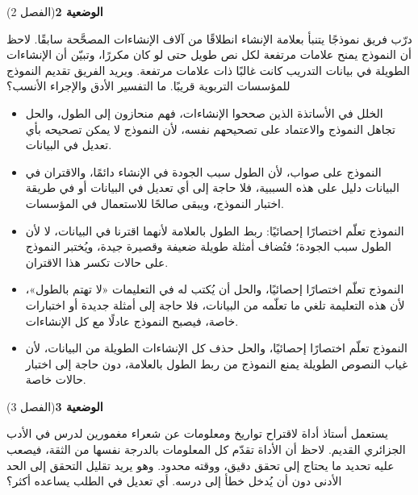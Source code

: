 \documentclass[11pt,a4paper]{article}
\begin{document}
\par\vspace{6pt}
\noindent
{\large\khatt\textbf{الوضعية 2}}\hfill{\small(الفصل 2)}\par\nopagebreak\vspace{3pt}
\setlength{\fboxsep}{7pt}\colorbox{gray!10}{\parbox{\dimexpr\linewidth-14pt}{درّب فريق نموذجًا يتنبأ بعلامة الإنشاء انطلاقًا من آلاف الإنشاءات المصحَّحة سابقًا. لاحظ أن النموذج يمنح علامات مرتفعة لكل نص طويل حتى لو كان مكررًا، وتبيّن أن الإنشاءات الطويلة في بيانات التدريب كانت غالبًا ذات علامات مرتفعة. ويريد الفريق تقديم النموذج للمؤسسات التربوية قريبًا. ما التفسير الأدق والإجراء الأنسب؟}}\par\nopagebreak
\begin{itemize}[leftmargin=1.0cm, labelsep=6pt, itemsep=3pt, topsep=4pt, parsep=0pt]
  \item[\textbf{أ)}] الخلل في الأساتذة الذين صححوا الإنشاءات، فهم منحازون إلى الطول، والحل تجاهل النموذج والاعتماد على تصحيحهم نفسه، لأن النموذج لا يمكن تصحيحه بأي تعديل في البيانات.
  \item[\textbf{ب)}] النموذج على صواب، لأن الطول سبب الجودة في الإنشاء دائمًا، والاقتران في البيانات دليل على هذه السببية، فلا حاجة إلى أي تعديل في البيانات أو في طريقة اختبار النموذج، ويبقى صالحًا للاستعمال في المؤسسات.
  \item[\textbf{ج)}] النموذج تعلّم اختصارًا إحصائيًا: ربط الطول بالعلامة لأنهما اقترنا في البيانات، لا لأن الطول سبب الجودة؛ فتُضاف أمثلة طويلة ضعيفة وقصيرة جيدة، ويُختبر النموذج على حالات تكسر هذا الاقتران.
  \item[\textbf{د)}] النموذج تعلّم اختصارًا إحصائيًا، والحل أن يُكتب له في التعليمات «لا تهتم بالطول»، لأن هذه التعليمة تلغي ما تعلّمه من البيانات، فلا حاجة إلى أمثلة جديدة أو اختبارات خاصة، فيصبح النموذج عادلًا مع كل الإنشاءات.
  \item[\textbf{هـ)}] النموذج تعلّم اختصارًا إحصائيًا، والحل حذف كل الإنشاءات الطويلة من البيانات، لأن غياب النصوص الطويلة يمنع النموذج من ربط الطول بالعلامة، دون حاجة إلى اختبار حالات خاصة.
\end{itemize}
\par\vspace{6pt}
\noindent
{\large\khatt\textbf{الوضعية 3}}\hfill{\small(الفصل 3)}\par\nopagebreak\vspace{3pt}
\setlength{\fboxsep}{7pt}\colorbox{gray!10}{\parbox{\dimexpr\linewidth-14pt}{يستعمل أستاذ أداة لاقتراح تواريخ ومعلومات عن شعراء مغمورين لدرس في الأدب الجزائري القديم. لاحظ أن الأداة تقدّم كل المعلومات بالدرجة نفسها من الثقة، فيصعب عليه تحديد ما يحتاج إلى تحقق دقيق، ووقته محدود. وهو يريد تقليل التحقق إلى الحد الأدنى دون أن يُدخل خطأ إلى درسه. أي تعديل في الطلب يساعده أكثر؟}}\par\nopagebreak
\end{document}
